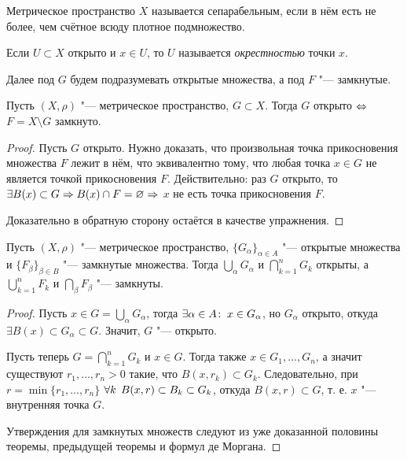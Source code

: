 \documentclass[main]{subfiles}
\begin{document}
\begin{definition}
  Метрическое пространство \( X \) называется сепарабельным,
  если в нём есть не более, чем счётное всюду плотное подмножество.
\end{definition}

\begin{definition}
  Если \( U \subset X \) открыто и \( x \in U \), то
  \( U \) называется \emph{окрестностью} точки \( x \).
\end{definition}

Далее под \( G \) будем подразумевать открытые множества,
а под \( F \) "--- замкнутые.

\begin{theorem}
  Пусть \( (X, \rho) \) "--- метрическое пространство,
  \( G \subset X \). Тогда \( G \) открыто \( \Leftrightarrow \)
  \( F = X \setminus G \) замкнуто.
\end{theorem}
\begin{proof}
  Пусть \( G \) открыто. Нужно доказать, что
  произвольная точка прикосновения множества \( F \)
  лежит в нём, что эквивалентно тому, что любая точка
  \( x \in G \) не является точкой прикосновения \( F \).
  Действительно: раз \( G \) открыто, то
  \( \exists B(x) \subset G \Rightarrow B(x) \cap F = \varnothing \Rightarrow \)
  \( x \) не есть точка прикосновения \( F \).

  Доказательно в обратную сторону остаётся в качестве упражнения.
\end{proof}

\begin{theorem}\label{thm:metric-topolotgy}
  Пусть \( (X, \rho) \) "--- метрическое пространство,
  \( \{ G_\alpha \}_{\alpha \in A} \) "--- открытые множества
  и \( \{ F_\beta \}_{\beta \in B} \) "--- замкнутые множества.
  Тогда \( \bigcup_{\alpha} G_\alpha \) и \( \bigcap_{k = 1}^n G_k \)
  открыты, а \( \bigcup_{k = 1}^n F_k \) и \( \bigcap_{\beta} F_\beta \) "---
  замкнуты.
\end{theorem}
\begin{proof}
  Пусть \( x \in G = \bigcup_{\alpha} G_\alpha \), тогда
  \( \exists \alpha \in A \colon \: x \in G_\alpha \), но \( G_\alpha \)
  открыто, откуда \( \exists B(x) \subset G_\alpha \subset G \).
  Значит, \( G \) "--- открыто.

  Пусть теперь \( G = \bigcap_{k = 1}^n G_k \) и \( x \in G \).
  Тогда также \( x \in G_1, \dots, G_n \), а значит
  существуют \( r_1, \dots, r_n > 0 \) такие, что
  \( B(x, r_k) \subset G_k \). Следовательно,
  при \( r = \min\{ r_1, \dots, r_n \} \)
  \( \forall {k} \; \,  B(x, r) \subset B_k \subset G_k \),
  откуда \( B(x, r) \subset G \),
  т. е. \( x \) "--- внутренняя точка \( G \).

  Утверждения для замкнутых множеств следуют из уже доказанной половины
  теоремы, предыдущей теоремы и формул де Моргана.
\end{proof}
\end{document}
